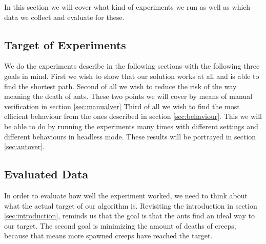 In this section we will cover what kind of experiments we run as well as which data we collect and evaluate for these.

\subsection{Target of Experiments}
We do the experiments describe in the following sections with the following three goals in mind.
First we wish to show that our solution works at all and is able to find the shortest path. Second of all we wish to reduce the risk of the way meaning the death of ants. These two points we will cover by means of manual verification in section \ref{sec:manualver}
Third of all we wish to find the most efficient behaviour from the ones described in section \ref{sec:behaviour}. This we will be able to do by running the experiments many times with different settings and different behaviours in headless mode. These results will be portrayed in section \ref{sec:autover}.

\subsection{Evaluated Data}
\label{sec:experimentevdata}

In order to evaluate how well the experiment worked, we need to think about what the actual target of our algorithm is. Revisiting the introduction in section \ref{sec:introduction}, reminds us that the goal is that the ants find an ideal way to our target. The second goal is minimizing the amount of deaths of creeps, because that means more spawned creeps have reached the target.


